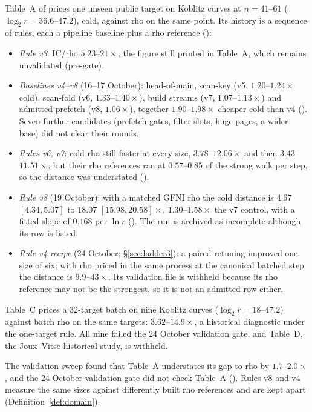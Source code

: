 Table~A of  prices one unseen public target on
Koblitz curves at $n=41$--$61$ ($\log_2r=36.6$--$47.2$), cold, against rho on
the same point. Its history is a sequence of rules, each a pipeline baseline
plus a rho reference ():
\begin{itemize}
\item \emph{Rule v3}: IC/rho $5.23$--$21\times$, the figure still printed
  in Table~A, which remains unvalidated (pre-gate).
\item \emph{Baselines v4--v8} (16--17 October): head-of-main, scan-key
  (v5, $1.20$--$1.24\times$ cold), scan-fold (v6, $1.33$--$1.40\times$),
  build streams (v7, $1.07$--$1.13\times$) and admitted prefetch (v8,
  $1.06\times$), together $1.90$--$1.98\times$ cheaper cold than v4
  (). Seven further
  candidates (prefetch gates, filter slots, huge pages, a wider base) did
  not clear their rounds.
\item \emph{Rules v6, v7}: cold rho still faster at every size,
  $3.78$--$12.06\times$ and then $3.43$--$11.51\times$; but their rho
  references ran at $0.57$--$0.85$ of the strong walk per step, so the
  distance was understated ().
\item \emph{Rule v8} (19 October): with a matched GFNI rho the cold distance
  is $4.67$ $[4.34,5.07]$ to $18.07$ $[15.98,20.58]\times$, $1.30$--$1.58\times$
  the v7 control, with a fitted slope of $0.168$ per $\ln r$
  (). The run is archived as
  incomplete although its row is listed.
\item \emph{Rule v4 recipe} (24 October; \S\ref{sec:ladder3}): a paired
  retuning improved one size of six; with rho priced in the same process at
  the canonical batched step the distance is $9.9$--$43\times$. Its
  validation file is withheld because its rho reference may not be the
  strongest, so it is not an admitted row either.
\end{itemize}
Table~C prices a 32-target batch on nine Koblitz curves ($\log_2 r=18$--$47.2$)
against batch rho on the same targets: $3.62$--$14.9\times$, a historical
diagnostic under the one-target rule. All nine failed the 24 October
validation gate, and Table~D, the Joux--Vitse historical study, is withheld.

The validation sweep found that Table~A understates its gap to rho by
$1.7$--$2.0\times$, and the 24 October validation gate did not check Table~A
(). Rules v8 and v4 measure the
same sizes against differently built rho references and are kept apart
(Definition~\ref{def:domain}).

